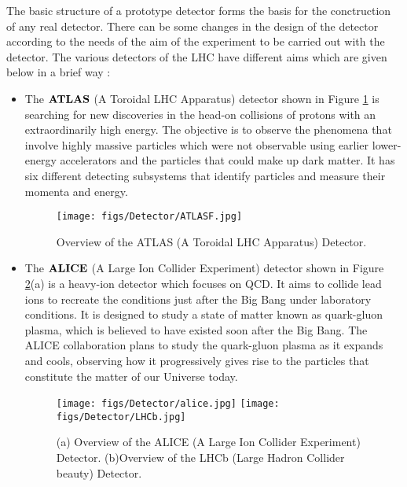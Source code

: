 The basic structure of a prototype detector forms the basis for the conctruction of any real detector. There can be some changes in the design of the detector according to the needs of the aim of the experiment to be carried out with the detector.
The various detectors of the LHC have different aims which are given below in a brief way :
\begin{itemize}
\item  
The $\bf{ATLAS}$ (A Toroidal LHC Apparatus) detector shown in Figure \ref{ATLAS} is searching for new discoveries in the head-on collisions of protons with an extraordinarily high energy. The objective is to observe the phenomena that involve highly massive particles which were not observable using earlier lower-energy accelerators and the particles that could make up dark matter. It has six different detecting subsystems that identify particles and measure their momenta and energy.
 
\begin{figure}[h!]
\begin{center} 
\texttt{[image: figs/Detector/ATLASF.jpg]}
\caption{Overview of the ATLAS (A Toroidal LHC Apparatus) Detector.}
\label{ATLAS}
\end{center}
\end{figure}
\item

The $\bf{ALICE}$ (A Large Ion Collider Experiment) detector shown in Figure \ref{ALICE}(a) is a heavy-ion detector which focuses on QCD. It aims to collide lead ions to recreate the conditions just after the Big Bang under laboratory conditions. It is designed to study a state of matter known as quark-gluon plasma, which is believed to have existed soon after the Big Bang. The ALICE collaboration plans to study the quark-gluon plasma as it expands and cools, observing how it progressively gives rise to the particles that constitute the matter of our Universe today.

\begin{figure}[h!]
\begin{center} 
\texttt{[image: figs/Detector/alice.jpg]}%
\texttt{[image: figs/Detector/LHCb.jpg]}

\caption{(a) Overview of the ALICE (A Large Ion Collider Experiment) Detector. (b)Overview of the LHCb (Large Hadron Collider beauty) Detector.}
\label{ALICE}
\end{center}
\end{figure}


\end{itemize}
